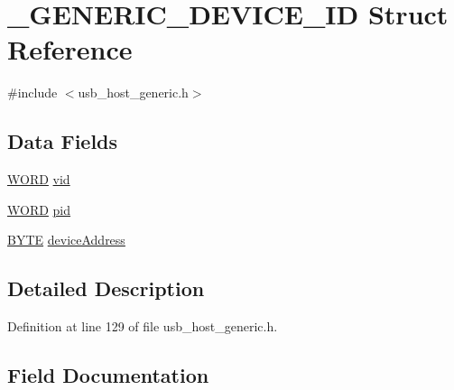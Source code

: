 \hypertarget{struct___g_e_n_e_r_i_c___d_e_v_i_c_e___i_d}{}\section{\+\_\+\+G\+E\+N\+E\+R\+I\+C\+\_\+\+D\+E\+V\+I\+C\+E\+\_\+\+I\+D Struct Reference}
\label{struct___g_e_n_e_r_i_c___d_e_v_i_c_e___i_d}


{\ttfamily \#include $<$usb\+\_\+host\+\_\+generic.\+h$>$}

\subsection*{Data Fields}
\begin{DoxyCompactItemize}
\item 
\hyperlink{_generic_type_defs_8h_a2b0e863dadf920709ec53d9088ee7c91}{W\+O\+R\+D} \hyperlink{struct___g_e_n_e_r_i_c___d_e_v_i_c_e___i_d_a9fcc011b7b6427b55322964f2d01781f}{vid}
\item 
\hyperlink{_generic_type_defs_8h_a2b0e863dadf920709ec53d9088ee7c91}{W\+O\+R\+D} \hyperlink{struct___g_e_n_e_r_i_c___d_e_v_i_c_e___i_d_a718a3b94d880d84d1532ae6411eb60cc}{pid}
\item 
\hyperlink{_generic_type_defs_8h_a4ae1dab0fb4b072a66584546209e7d58}{B\+Y\+T\+E} \hyperlink{struct___g_e_n_e_r_i_c___d_e_v_i_c_e___i_d_aa1d659071a17ee8d0172d34d6783b517}{device\+Address}
\end{DoxyCompactItemize}


\subsection{Detailed Description}


Definition at line 129 of file usb\+\_\+host\+\_\+generic.\+h.



\subsection{Field Documentation}
\hypertarget{struct___g_e_n_e_r_i_c___d_e_v_i_c_e___i_d_aa1d659071a17ee8d0172d34d6783b517}{}
